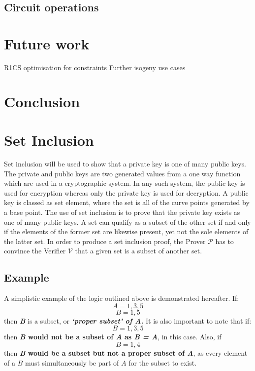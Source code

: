 \documentclass{article}
\begin{document}
\subsection{Circuit operations}

\section{Future work}
R1CS optimisation for constraints 
Further isogeny use cases 

\section{Conclusion}
 
\section{Set Inclusion}
Set inclusion will be used to show that a private key is one of many public keys. The private and public keys are two generated values from a one way function which are used in a cryptographic system. In any such system, the public key is used for encryption whereas only the private key is used for decryption. A public key is classed as set element, where the set is all of the curve points generated by a base point. The use of set inclusion is to prove that the private key exists as one of many public keys. A set can qualify as a subset of the other set if and only if the elements of the former set are likewise present, yet not the sole elements of the latter set. In order to produce a set inclusion proof, the Prover $\mathcal{P}$ has to convince the Verifier $\mathcal{V}$ that a given set is a subset of another set.
\subsection{Example}
A simplistic example of the logic outlined above is demonstrated hereafter. If:  $$ A={1,3,5} $$
$$ B={1,5} $$ then \textbf{\textit{B}} is a subset, or \textbf{\textit{‘proper subset’ of A.}} 
It is also important to note that if: $$ B={1,3,5} $$ then \textbf{\textit{B} would not be a subset of \textit{A} as \textit{B = A}}, in this case. Also, if $$ B={1,4} $$ then \textbf{\textit{B} would be a subset but not a proper subset of \textit{A}}, as every element of a $B$ must simultaneously be part of $A$ for the subset to exist.
\end{document}
